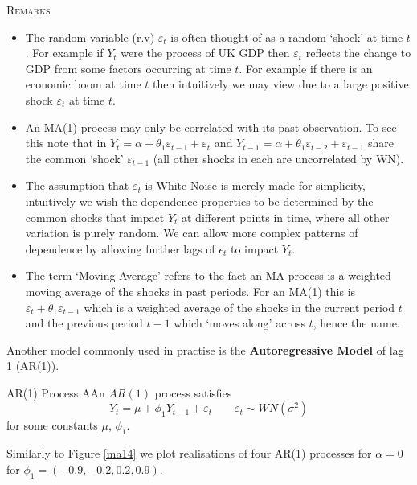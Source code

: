 \documentclass[openany]{tufte-book} %
\begin{document}
\textsc{Remarks}
\begin{itemize}
\item The random variable (r.v) $\varepsilon_t$ is often thought  of as a random `shock' at time $t$. For example if $Y_t$ were the process of UK GDP then $\varepsilon_t$ reflects the change to GDP from some factors occurring at time $t$.  For example if there is an economic boom at time $t$ then intuitively we may view due to a large positive shock  $\varepsilon_t$ at time $t$.

    \item  An  MA(1) process  may only be correlated  with its past observation. To see this note that in $Y_t=\alpha + \theta_1\varepsilon_{t-1}+\varepsilon_{t}$ and $Y_{t-1}=\alpha+\theta_1\varepsilon_{t-2}+\varepsilon_{t-1}$ share the common `shock' $\varepsilon_{t-1}$ (all other shocks in each are uncorrelated by WN).  
    \item The assumption that $\varepsilon_t$ is White Noise is merely made for simplicity, intuitively we wish the dependence properties to be determined by the common shocks that impact $Y_t$ at different points in time, where all other variation is purely random. We can allow more complex patterns of dependence by allowing further lags of $\epsilon_t$ to impact $Y_t$.

    \item The term `Moving Average' refers to the fact an MA process is a weighted moving average of the shocks in past periods. For an MA(1) this is $\varepsilon_t +\theta_1 \varepsilon_{t-1}$ which is a weighted average of the shocks in the current period $t$ and the previous period $t-1$ which `moves along' across $t$, hence the name.

\end{itemize}

Another model commonly used in practise is the \textbf{Autoregressive Model} of lag 1 (AR(1)).
\begin{mydef}{AR(1) Process}
AAn
$AR(1)$ process satisfies
\begin{equation*}
Y_{t}=\mu +\phi_1 Y_{t-1}+\varepsilon_{t} \qquad \varepsilon_t\sim WN(\sigma^2)
\end{equation*}
for some constants $\mu$, $\phi_1$. \end{mydef}

Similarly to Figure \ref{ma14} we plot realisations of four AR(1) processes for $\alpha=0$ for $\phi_1=(-0.9,-0.2,0.2,0.9)$.
\end{document}
